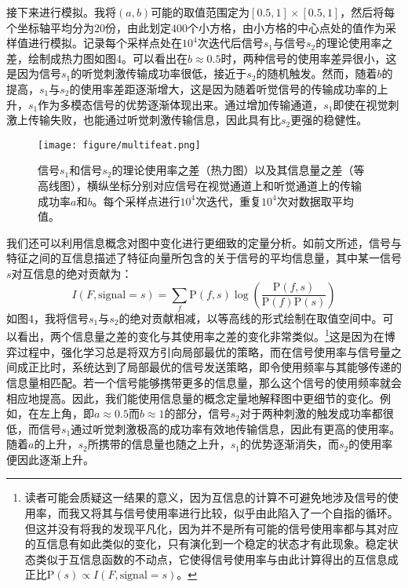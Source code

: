 \documentclass[12pt]{ctexart}  %
\begin{document}
接下来进行模拟。我将$(a,b)$可能的取值范围定为$[0.5,1]\times [0.5,1]$，然后将每个坐标轴平均分为$20$份，由此划定$400$个小方格，由小方格的中心点处的值作为采样值进行模拟。记录每个采样点处在$10^4$次迭代后信号$s_1$与信号$s_2$的理论使用率之差，绘制成热力图如图4。可以看出在$b\approx 0.5$时，两种信号的使用率差异很小，这是因为信号$s_1$的听觉刺激传输成功率很低，接近于$s_2$的随机触发。然而，随着$b$的提高，$s_1$与$s_2$的使用率差距逐渐增大，这是因为随着听觉信号的传输成功率的上升，$s_1$作为多模态信号的优势逐渐体现出来。通过增加传输通道，$s_1$即使在视觉刺激上传输失败，也能通过听觉刺激传输信息，因此具有比$s_2$更强的稳健性。

\begin{figure}[htbp]
    \centering
    \texttt{[image: figure/multifeat.png]}
    \caption{信号$s_1$和信号$s_2$的理论使用率之差（热力图）以及其信息量之差（等高线图），横纵坐标分别对应信号在视觉通道上和听觉通道上的传输成功率$a$和$b$。每个采样点进行$10^4$次迭代，重复$10^4$次对数据取平均值。}
\end{figure}

我们还可以利用信息概念对图中变化进行更细致的定量分析。如前文所述，信号与特征之间的互信息描述了特征向量所包含的关于信号的平均信息量，其中某一信号$s$对互信息的绝对贡献为：
\begin{equation}
    I(F,\text{signal}=s)=\sum_f \text{P}(f,s)\log (\frac{\text{P}(f,s)}{\text{P}(f)\text{P}(s)})
\end{equation}
如图4，我将信号$s_1$与$s_2$的绝对贡献相减，以等高线的形式绘制在取值空间中。可以看出，两个信息量之差的变化与其使用率之差的变化非常类似。\footnote{读者可能会质疑这一结果的意义，因为互信息的计算不可避免地涉及信号的使用率，而我又将其与信号使用率进行比较，似乎由此陷入了一个自指的循环。但这并没有将我的发现平凡化，因为并不是所有可能的信号使用率都与其对应的互信息有如此类似的变化，只有演化到一个稳定的状态才有此现象。稳定状态类似于互信息函数的不动点，它使得信号使用率与由此计算得出的互信息成正比$\text{P}(s)\propto I(F,\text{signal}=s)$。}这是因为在博弈过程中，强化学习总是将双方引向局部最优的策略，而在信号使用率与信号量之间成正比时，系统达到了局部最优的信号发送策略，即令使用频率与其能够传递的信息量相匹配。若一个信号能够携带更多的信息量，那么这个信号的使用频率就会相应地提高。因此，我们能使用信息量的概念定量地解释图中更细节的变化。例如，在左上角，即$a\approx  0.5$而$b\approx 1$的部分，信号$s_2$对于两种刺激的触发成功率都很低，而信号$s_1$通过听觉刺激极高的成功率有效地传输信息，因此有更高的使用率。随着$a$的上升，$s_2$所携带的信息量也随之上升，$s_1$的优势逐渐消失，而$s_2$的使用率便因此逐渐上升。
\end{document}
